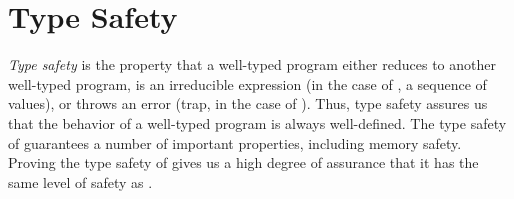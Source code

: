 \section{Type Safety}
\label{sec:typesafety}
\emph{Type safety} is the property that a well-typed program either reduces to another well-typed program, is an irreducible expression (in the case of \name, a sequence of values), or throws an error (trap, in the case of \name).
Thus, type safety assures us that the behavior of a well-typed program is always well-defined.
The type safety of \wasm guarantees a number of important properties, including memory safety.
Proving the type safety of \name gives us a high degree of assurance that it has the same level of safety as \wasm.




